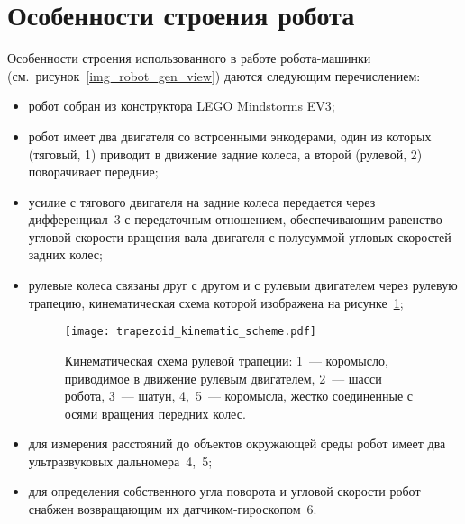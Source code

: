\newpage
\section{Особенности строения робота}\label{part_robot_features}
Особенности строения использованного в работе робота-машинки (см.~рисунок~\ref{img_robot_gen_view}) даются следующим перечислением:
\begin{itemize}
    \item робот собран из конструктора LEGO Mindstorms EV3;
    \item робот имеет два двигателя со встроенными энкодерами, один из которых (тяговый, 1) приводит в движение задние колеса, а второй (рулевой, 2) поворачивает передние;
    \item усилие с тягового двигателя на задние колеса передается через дифференциал~3 с передаточным отношением, обеспечивающим равенство угловой скорости вращения вала двигателя с полусуммой угловых скоростей задних колес;
    \item рулевые колеса связаны друг с другом и с рулевым двигателем через рулевую трапецию, кинематическая схема которой изображена на рисунке~\ref{img_trapezoid_scheme};
    \begin{figure}[h]
        \centering
        \texttt{[image: trapezoid\_kinematic\_scheme.pdf]}
        \caption{Кинематическая схема рулевой трапеции: 1~--- коромысло, приводимое в движение рулевым двигателем, 2~--- шасси робота, 3~--- шатун, 4,~5~--- коромысла, жестко соединенные с осями вращения передних колес.}
        \label{img_trapezoid_scheme}
    \end{figure}
    \item для измерения расстояний до объектов окружающей среды робот имеет два ультразвуковых дальномера~4,~5;
    \item для определения собственного угла поворота и угловой скорости робот снабжен возвращающим их датчиком-гироскопом~6.
\end{itemize}

